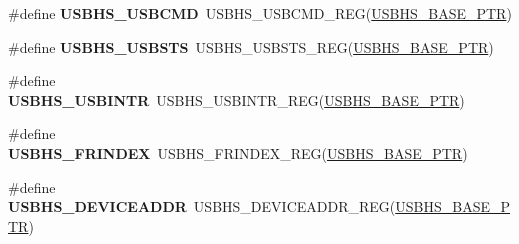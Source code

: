 \begin{DoxyCompactItemize}
\item 
\hypertarget{group___u_s_b_h_s___register___accessor___macros_ga050587e047d2632cc245d23298abe5ec}{}\#define {\bfseries U\+S\+B\+H\+S\+\_\+\+U\+S\+B\+C\+M\+D}~U\+S\+B\+H\+S\+\_\+\+U\+S\+B\+C\+M\+D\+\_\+\+R\+E\+G(\hyperlink{group___u_s_b_h_s___peripheral_gaa2bc10b8cd66f96acd39e15b3a581306}{U\+S\+B\+H\+S\+\_\+\+B\+A\+S\+E\+\_\+\+P\+T\+R})\label{group___u_s_b_h_s___register___accessor___macros_ga050587e047d2632cc245d23298abe5ec}

\item 
\hypertarget{group___u_s_b_h_s___register___accessor___macros_ga1157fd61cef5926633b065600b40334d}{}\#define {\bfseries U\+S\+B\+H\+S\+\_\+\+U\+S\+B\+S\+T\+S}~U\+S\+B\+H\+S\+\_\+\+U\+S\+B\+S\+T\+S\+\_\+\+R\+E\+G(\hyperlink{group___u_s_b_h_s___peripheral_gaa2bc10b8cd66f96acd39e15b3a581306}{U\+S\+B\+H\+S\+\_\+\+B\+A\+S\+E\+\_\+\+P\+T\+R})\label{group___u_s_b_h_s___register___accessor___macros_ga1157fd61cef5926633b065600b40334d}

\item 
\hypertarget{group___u_s_b_h_s___register___accessor___macros_gad19e4a9d0197c3b756d3de9b730afc2b}{}\#define {\bfseries U\+S\+B\+H\+S\+\_\+\+U\+S\+B\+I\+N\+T\+R}~U\+S\+B\+H\+S\+\_\+\+U\+S\+B\+I\+N\+T\+R\+\_\+\+R\+E\+G(\hyperlink{group___u_s_b_h_s___peripheral_gaa2bc10b8cd66f96acd39e15b3a581306}{U\+S\+B\+H\+S\+\_\+\+B\+A\+S\+E\+\_\+\+P\+T\+R})\label{group___u_s_b_h_s___register___accessor___macros_gad19e4a9d0197c3b756d3de9b730afc2b}

\item 
\hypertarget{group___u_s_b_h_s___register___accessor___macros_gaa269579296b7809e98a9b388ce47a3c7}{}\#define {\bfseries U\+S\+B\+H\+S\+\_\+\+F\+R\+I\+N\+D\+E\+X}~U\+S\+B\+H\+S\+\_\+\+F\+R\+I\+N\+D\+E\+X\+\_\+\+R\+E\+G(\hyperlink{group___u_s_b_h_s___peripheral_gaa2bc10b8cd66f96acd39e15b3a581306}{U\+S\+B\+H\+S\+\_\+\+B\+A\+S\+E\+\_\+\+P\+T\+R})\label{group___u_s_b_h_s___register___accessor___macros_gaa269579296b7809e98a9b388ce47a3c7}

\item 
\hypertarget{group___u_s_b_h_s___register___accessor___macros_ga93f4fac49e6787ab7cb79299ed4fa0be}{}\#define {\bfseries U\+S\+B\+H\+S\+\_\+\+D\+E\+V\+I\+C\+E\+A\+D\+D\+R}~U\+S\+B\+H\+S\+\_\+\+D\+E\+V\+I\+C\+E\+A\+D\+D\+R\+\_\+\+R\+E\+G(\hyperlink{group___u_s_b_h_s___peripheral_gaa2bc10b8cd66f96acd39e15b3a581306}{U\+S\+B\+H\+S\+\_\+\+B\+A\+S\+E\+\_\+\+P\+T\+R})\label{group___u_s_b_h_s___register___accessor___macros_ga93f4fac49e6787ab7cb79299ed4fa0be}


\end{DoxyCompactItemize}
